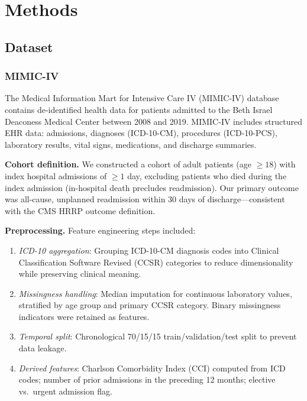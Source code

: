 \documentclass[11pt,letterpaper]{article}
\begin{document}
\section{Methods}
\label{sec:methods}

\subsection{Dataset}
\label{sec:dataset}

\subsubsection{MIMIC-IV}

The Medical Information Mart for Intensive Care IV (MIMIC-IV) database \citep{johnson2023mimic} contains de-identified health data for patients admitted to the Beth Israel Deaconess Medical Center between 2008 and 2019. MIMIC-IV includes structured EHR data: admissions, diagnoses (ICD-10-CM), procedures (ICD-10-PCS), laboratory results, vital signs, medications, and discharge summaries.

\textbf{Cohort definition.} We constructed a cohort of adult patients (age $\geq 18$) with index hospital admissions of $\geq 1$ day, excluding patients who died during the index admission (in-hospital death precludes readmission). Our primary outcome was all-cause, unplanned readmission within 30 days of discharge---consistent with the CMS HRRP outcome definition.

\textbf{Preprocessing.} Feature engineering steps included:
\begin{enumerate}[leftmargin=1.5em,itemsep=0.2em]
  \item \textit{ICD-10 aggregation}: Grouping ICD-10-CM diagnosis codes into Clinical Classification Software Revised (CCSR) categories to reduce dimensionality while preserving clinical meaning.
  \item \textit{Missingness handling}: Median imputation for continuous laboratory values, stratified by age group and primary CCSR category. Binary missingness indicators were retained as features.
  \item \textit{Temporal split}: Chronological 70/15/15 train/validation/test split to prevent data leakage.
  \item \textit{Derived features}: Charlson Comorbidity Index (CCI) computed from ICD codes; number of prior admissions in the preceding 12 months; elective vs.\ urgent admission flag.
\end{enumerate}
\end{document}
